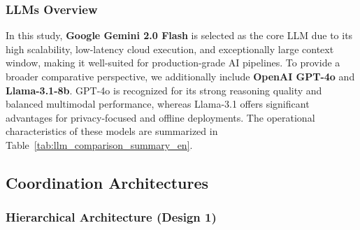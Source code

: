 \documentclass{ieeeaccess}
\begin{document}
\subsubsection{LLMs Overview}
In this study, \textbf{Google Gemini 2.0 Flash} is selected as the core LLM due to its high scalability, low-latency cloud execution, and exceptionally large context window, making it well-suited for production-grade AI pipelines. To provide a broader comparative perspective, we additionally include \textbf{OpenAI GPT-4o} and \textbf{Llama-3.1-8b}. GPT-4o is recognized for its strong reasoning quality and balanced multimodal performance, whereas Llama-3.1 offers significant advantages for privacy-focused and offline deployments. The operational characteristics of these models are summarized in Table~\ref{tab:llm_comparison_summary_en}.

\begin{table}[h!]
\centering
\caption{Operational Characteristics and Execution Behavior of Leading Large Language Models.}
\label{tab:llm_comparison_summary_en}
\end{table}

\subsection{Coordination Architectures}
\subsubsection{Hierarchical Architecture (Design 1)}
\end{document}
